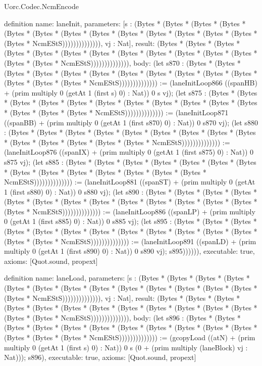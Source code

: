 \begin{lexlean}{Uorc.Codec.NcmEncode}
\begin{semanticmodule}
definition{
  name: laneInit,
  parameters: [s : (Bytes * (Bytes * (Bytes * (Bytes * (Bytes * (Bytes * (Bytes * (Bytes * (Bytes * (Bytes * (Bytes * (Bytes * (Bytes * (Bytes * NcmEStS)))))))))))))), vj : Nat],
  result: (Bytes * (Bytes * (Bytes * (Bytes * (Bytes * (Bytes * (Bytes * (Bytes * (Bytes * (Bytes * (Bytes * (Bytes * (Bytes * (Bytes * NcmEStS)))))))))))))),
  body: (let s870 : (Bytes * (Bytes * (Bytes * (Bytes * (Bytes * (Bytes * (Bytes * (Bytes * (Bytes * (Bytes * (Bytes * (Bytes * (Bytes * (Bytes * NcmEStS)))))))))))))) := (laneInitLoop866 ((spanHB) + (prim multiply 0 (getAt 1 (first s) 0) : Nat)) 0 s vj); (let s875 : (Bytes * (Bytes * (Bytes * (Bytes * (Bytes * (Bytes * (Bytes * (Bytes * (Bytes * (Bytes * (Bytes * (Bytes * (Bytes * (Bytes * NcmEStS)))))))))))))) := (laneInitLoop871 ((spanBB) + (prim multiply 0 (getAt 1 (first s870) 0) : Nat)) 0 s870 vj); (let s880 : (Bytes * (Bytes * (Bytes * (Bytes * (Bytes * (Bytes * (Bytes * (Bytes * (Bytes * (Bytes * (Bytes * (Bytes * (Bytes * (Bytes * NcmEStS)))))))))))))) := (laneInitLoop876 ((spanIX) + (prim multiply 0 (getAt 1 (first s875) 0) : Nat)) 0 s875 vj); (let s885 : (Bytes * (Bytes * (Bytes * (Bytes * (Bytes * (Bytes * (Bytes * (Bytes * (Bytes * (Bytes * (Bytes * (Bytes * (Bytes * (Bytes * NcmEStS)))))))))))))) := (laneInitLoop881 ((spanST) + (prim multiply 0 (getAt 1 (first s880) 0) : Nat)) 0 s880 vj); (let s890 : (Bytes * (Bytes * (Bytes * (Bytes * (Bytes * (Bytes * (Bytes * (Bytes * (Bytes * (Bytes * (Bytes * (Bytes * (Bytes * (Bytes * NcmEStS)))))))))))))) := (laneInitLoop886 ((spanLP) + (prim multiply 0 (getAt 1 (first s885) 0) : Nat)) 0 s885 vj); (let s895 : (Bytes * (Bytes * (Bytes * (Bytes * (Bytes * (Bytes * (Bytes * (Bytes * (Bytes * (Bytes * (Bytes * (Bytes * (Bytes * (Bytes * NcmEStS)))))))))))))) := (laneInitLoop891 ((spanLD) + (prim multiply 0 (getAt 1 (first s890) 0) : Nat)) 0 s890 vj); s895)))))),
  executable: true,
  axioms: [Quot.sound, propext]
}

definition{
  name: laneLoad,
  parameters: [s : (Bytes * (Bytes * (Bytes * (Bytes * (Bytes * (Bytes * (Bytes * (Bytes * (Bytes * (Bytes * (Bytes * (Bytes * (Bytes * (Bytes * NcmEStS)))))))))))))), vj : Nat],
  result: (Bytes * (Bytes * (Bytes * (Bytes * (Bytes * (Bytes * (Bytes * (Bytes * (Bytes * (Bytes * (Bytes * (Bytes * (Bytes * (Bytes * NcmEStS)))))))))))))),
  body: (let s896 : (Bytes * (Bytes * (Bytes * (Bytes * (Bytes * (Bytes * (Bytes * (Bytes * (Bytes * (Bytes * (Bytes * (Bytes * (Bytes * (Bytes * NcmEStS)))))))))))))) := (gcopyLoad ((atN) + (prim multiply 0 (getAt 1 (first s) 0) : Nat)) 0 s (0 + (prim multiply (laneBlock) vj : Nat))); s896),
  executable: true,
  axioms: [Quot.sound, propext]
}


\end{semanticmodule}
\end{lexlean}
